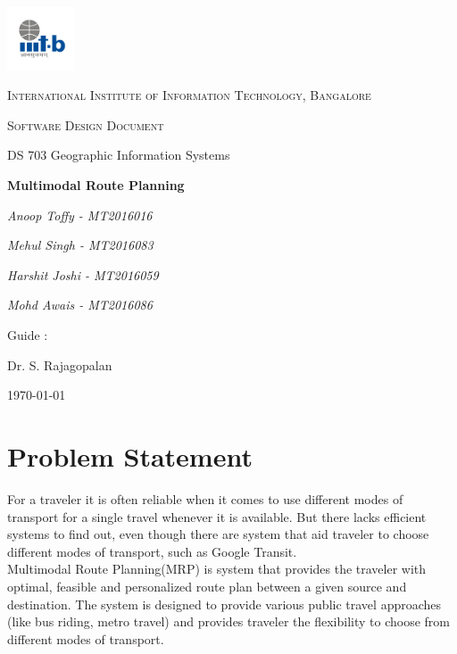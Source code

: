 \documentclass[12pt,a4paper]{article}
\begin{document}
\begin{titlepage}
	\centering
	\includegraphics[width=0.15\textwidth]{IIIT-B_logo.jpg}\par\vspace{1cm}
	{\scshape\LARGE International Institute of Information Technology, Bangalore \par}
	\vspace{1cm}
	{\scshape\Large Software Design Document\par}
	{\Large DS 703 Geographic Information Systems\par}
	\vspace{1.5cm}
	{\huge\bfseries Multimodal Route Planning\par}
	\vspace{2cm}	   
	{\Large\itshape Anoop Toffy - MT2016016\par}
	{\Large\itshape Mehul Singh - MT2016083\par}		 
	{\Large\itshape Harshit Joshi - MT2016059\par}	 
	{\Large\itshape Mohd Awais - MT2016086\par}
	\vfill
	Guide : \par
	Dr. S. Rajagopalan

	\vfill

	{\large \today\par}
\end{titlepage}


\tableofcontents
\listoffigures
\listoftables
\newpage

\section{Problem Statement}
For a traveler it is often reliable when it comes to use different modes of transport for a single travel whenever it is available. But there lacks efficient systems to find out, even though there are system that aid traveler to choose different modes of transport, such as Google Transit. \\
Multimodal Route Planning(MRP) is system that provides the traveler with optimal, feasible and personalized route plan between a given source and destination. The system is designed to provide various public travel approaches (like bus riding, metro travel) and provides traveler the flexibility to choose from different modes of transport.
\end{document}
